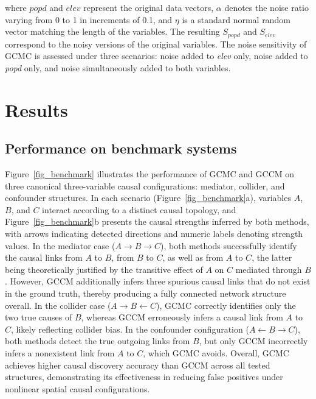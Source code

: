 \documentclass[authoryear,preprint,review,12pt]{elsarticle}
\begin{document}
\noindent where \(popd\) and \(elev\) represent the original data vectors, \(\alpha\) denotes the noise ratio varying from 0 to 1 in increments of 0.1, and \(\eta\) is a standard normal random vector matching the length of the variables. The resulting \(S_{popd}\) and \(S_{elev}\) correspond to the noisy versions of the original variables. The noise sensitivity of GCMC is assessed under three scenarios: noise added to \textit{elev} only, noise added to \textit{popd} only, and noise simultaneously added to both variables.

\section{Results}\label{sec3} 

\subsection{Performance on benchmark systems}\label{benchmark}

Figure~\ref{fig_benchmark} illustrates the performance of GCMC and GCCM on three canonical three-variable causal configurations: mediator, collider, and confounder structures. In each scenario (Figure~\ref{fig_benchmark}a), variables \(A\), \(B\), and \(C\) interact according to a distinct causal topology, and Figure~\ref{fig_benchmark}b presents the causal strengths inferred by both methods, with arrows indicating detected directions and numeric labels denoting strength values. In the mediator case ($A \rightarrow B \rightarrow C$), both methods successfully identify the causal links from $A$ to $B$, from $B$ to $C$, as well as from $A$ to $C$, the latter being theoretically justified by the transitive effect of $A$ on $C$ mediated through $B$ \citep{leng2020pcm}. However, GCCM additionally infers three spurious causal links that do not exist in the ground truth, thereby producing a fully connected network structure overall. In the collider case ($A \rightarrow B \leftarrow C$), GCMC correctly identifies only the two true causes of \(B\), whereas GCCM erroneously infers a causal link from \(A\) to \(C\), likely reflecting collider bias. In the confounder configuration ($A \leftarrow B \rightarrow C$), both methods detect the true outgoing links from \(B\), but only GCCM incorrectly infers a nonexistent link from \(A\) to \(C\), which GCMC avoids. Overall, GCMC achieves higher causal discovery accuracy than GCCM across all tested structures, demonstrating its effectiveness in reducing false positives under nonlinear spatial causal configurations.
\end{document}
